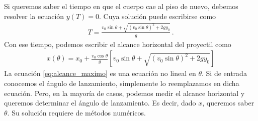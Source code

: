 \documentclass[12pt]{article}
\begin{document}
Si queremos saber el tiempo en que el cuerpo cae al piso de nuevo,
debemos resolver la ecuación $y(T) = 0$. Cuya solución 
puede escribirse como
\begin{align*}
    T = \frac{v_0 \sin\theta + \sqrt{(v_0 \sin\theta)^2 + 2 g y_0}}{g}\,.
\end{align*}
Con ese tiempo, podemos escribir el alcance horizontal del proyectil 
como
\begin{align}
    \label{eq:alcance_maximo}
    x(\theta) = x_0 + \frac{v_0 \cos\theta}{g} 
    \left[ v_0 \sin\theta + \sqrt{(v_0 \sin\theta)^2 + 2 g y_0} \right]
\end{align}
La ecuación \eqref{eq:alcance_maximo} es una ecuación no 
lineal en $\theta$. Si de entrada conocemos el ángulo de 
lanzamiento, simplemente lo reemplazamos en dicha ecuación.
Pero, en la mayoría de casos, podemos medir el alcance horizontal
y queremos determinar el ángulo de lanzamiento. Es decir, 
dado $x$, queremos saber $\theta$. Su solución requiere de 
métodos numéricos.
\end{document}
